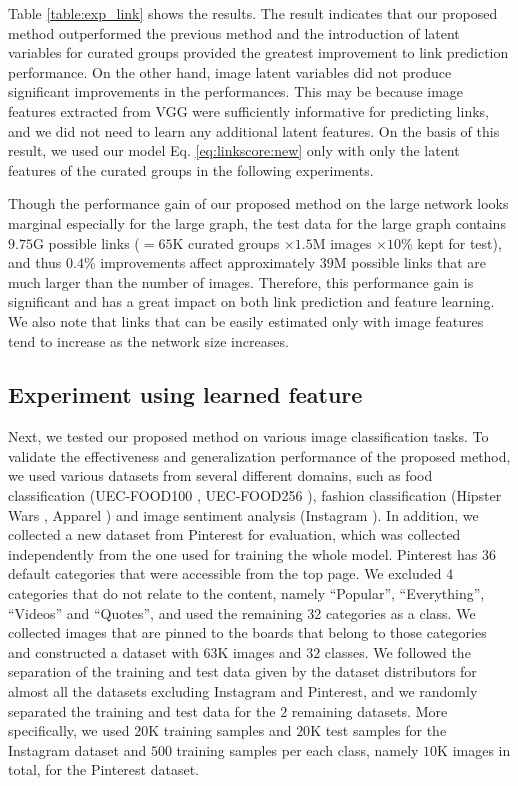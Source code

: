 \documentclass[letterpaper]{article} %
\begin{document}
Table \ref{table:exp_link} shows the results.
The result indicates that our proposed method outperformed the previous method and the introduction of latent variables for curated groups provided the greatest improvement to link prediction performance.
On the other hand, image latent variables did not produce significant improvements in the performances.
This may be because image features extracted from VGG were sufficiently informative for predicting links, and we did not need to learn any additional latent features.
On the basis of this result, we used our model Eq. \eqref{eq:linkscore:new} only with only the latent features of the curated groups in the following experiments.

Though the performance gain of our proposed method on the large network looks marginal especially for the large graph, the test data for the large graph contains $9.75$G possible links ($= 65$K curated groups $\times 1.5$M images $\times 10$\% kept for test), and thus $0.4$\% improvements affect approximately $39$M possible links that are much larger than the number of images.
Therefore, this performance gain is significant and has a great impact on both link prediction and feature learning.
We also note that links that can be easily estimated only with image features tend to increase as the network size increases.

\subsection{Experiment using learned feature}
\label{sec:exp:pred}
\indent

Next, we tested our proposed method on various image classification tasks.
To validate the effectiveness and generalization performance of the proposed method, we used various datasets from several different domains, such as food classification (UEC-FOOD100 \cite{Matsuda2012}, UEC-FOOD256 \cite{Kawano2014c}), fashion classification (Hipster Wars \cite{Kiapour2014}, Apparel \cite{Bossard2012}) and image sentiment analysis (Instagram \cite{Katsurai2016}).
In addition, we collected a new dataset from Pinterest for evaluation, which was collected independently from the one used for training the whole model.
Pinterest has 36 default categories that were accessible from the top page.
We excluded 4 categories that do not relate to the content, namely ``Popular'', ``Everything'', ``Videos'' and ``Quotes'', and used the remaining 32 categories as a class.
We collected images that are pinned to the boards that belong to those categories and constructed a dataset with $63$K images and $32$ classes.
We followed the separation of the training and test data given by the dataset distributors for almost all the datasets excluding Instagram and Pinterest, and we randomly separated the training and test data for the $2$ remaining datasets.
More specifically, we used $20$K training samples and $20$K test samples for the Instagram dataset and $500$ training samples per each class, namely $10$K images in total, for the Pinterest dataset.
\end{document}
